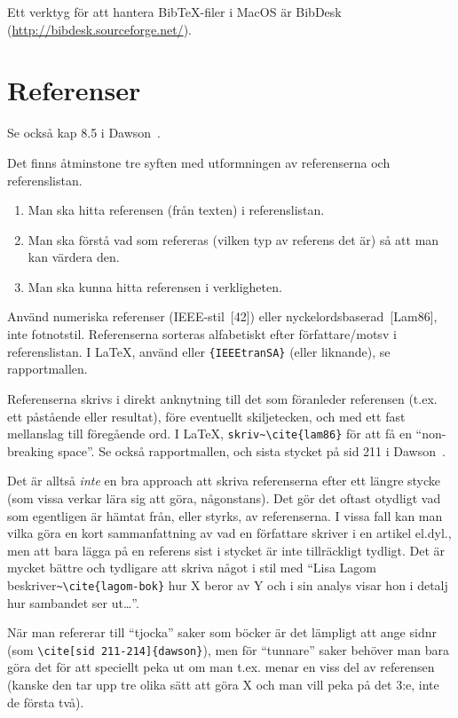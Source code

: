 \documentclass[a4paper,12pt]{article}
\begin{document}
Ett verktyg för att hantera BibTeX-filer i MacOS är BibDesk (\url{http://bibdesk.sourceforge.net/}).


\section{Referenser}
\label{sec:referenser}

Se också kap 8.5 i Dawson~\cite{dawson:projects-in-computing}.

Det finns åtminstone tre syften med utformningen av referenserna och referenslistan.
\begin{enumerate}
\item Man ska hitta referensen (från texten) i referenslistan.
\item Man ska förstå vad som refereras (vilken typ av referens det är) så att man kan värdera den.
\item Man ska kunna hitta referensen i verkligheten.
\end{enumerate}

Använd numeriska referenser (IEEE-stil~[42]) eller nyckelordsbaserad~[Lam86], inte fotnotstil. Referenserna sorteras alfabetiskt efter författare/motsv i referenslistan. I LaTeX, använd \verb|| eller \verb|{IEEEtranSA}| (eller liknande), se rapportmallen.

Referenserna skrivs i direkt anknytning till det som föranleder referensen (t.ex. ett påstående eller resultat), före eventuellt skiljetecken, och med ett fast mellanslag till föregående ord. I LaTeX, \verb|skriv~\cite{lam86}| för att få en ``non-breaking space''. Se också rapportmallen, och sista stycket på sid 211 i Dawson~\cite{dawson:projects-in-computing}.

Det är alltså \emph{inte} en bra approach att skriva referenserna efter ett längre stycke (som vissa verkar lära sig att göra, någonstans). Det gör det oftast otydligt vad som egentligen är hämtat från, eller styrks, av referenserna. I vissa fall kan man vilka göra en kort sammanfattning av vad en författare skriver i en artikel el.dyl., men att bara lägga på en referens sist i stycket är inte tillräckligt tydligt. Det är mycket bättre och tydligare att skriva något i stil med ``Lisa Lagom beskriver\verb|~\cite{lagom-bok}| hur X beror av Y och i sin analys visar hon i detalj hur sambandet ser ut\ldots''.

När man refererar till ``tjocka'' saker som böcker är det lämpligt att ange sidnr
(som \verb|\cite[sid 211-214]{dawson}|), men för ``tunnare'' saker behöver man bara göra det för att speciellt peka ut om man t.ex. menar en viss del av referensen (kanske den tar upp tre olika sätt att göra X och man vill peka på det 3:e, inte de första två).
\end{document}

